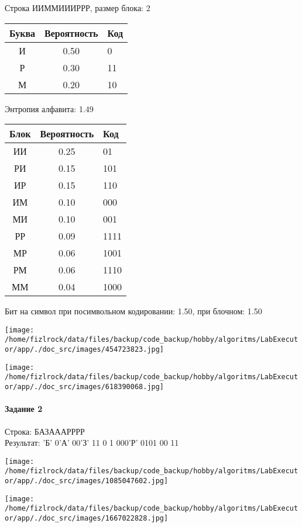 \documentclass[a4paper, 12pt]{article}
\begin{document}
Строка ИИММИИИРРР, размер блока: 2
\begin{center}
 \begin{tabular}{ |c|c|l| } 
  \hline
     Буква & Вероятность & Код\\ \hline
И & 0.50 & 0\\\hline
Р & 0.30 & 11\\\hline
М & 0.20 & 10
\\ \hline \end{tabular}
\end{center}
Энтропия алфавита: 1.49
\begin{center}
 \begin{tabular}{ |c|c|l| } 
  \hline
     Блок & Вероятность & Код\\ \hline
ИИ & 0.25 & 01\\\hline
РИ & 0.15 & 101\\\hline
ИР & 0.15 & 110\\\hline
ИМ & 0.10 & 000\\\hline
МИ & 0.10 & 001\\\hline
РР & 0.09 & 1111\\\hline
МР & 0.06 & 1001\\\hline
РМ & 0.06 & 1110\\\hline
ММ & 0.04 & 1000
\\ \hline \end{tabular}
\end{center}
Бит на символ при посимвольном кодировании: 1.50, при блочном: 1.50

\texttt{[image: /home/fizlrock/data/files/backup/code\_backup/hobby/algoritms/LabExecutor/app/./doc\_src/images/454723823.jpg]}

\texttt{[image: /home/fizlrock/data/files/backup/code\_backup/hobby/algoritms/LabExecutor/app/./doc\_src/images/618390068.jpg]}
\pagebreak
\paragraph{Задание 2}

Строка: 
БАЗАААРРРР\\
Результат: 'Б' 0'А' 00'З' 11 0 1 000'Р' 0101 00 11

\texttt{[image: /home/fizlrock/data/files/backup/code\_backup/hobby/algoritms/LabExecutor/app/./doc\_src/images/1085047602.jpg]}

\texttt{[image: /home/fizlrock/data/files/backup/code\_backup/hobby/algoritms/LabExecutor/app/./doc\_src/images/1667022828.jpg]}
\end{document}
